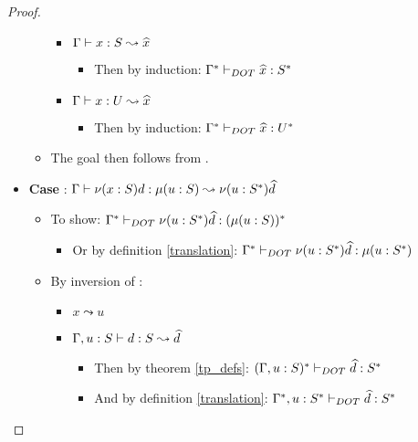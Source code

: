 \begin{proof}
\begin{itemize}
\begin{itemize}
            \begin{itemize}
                \item $\Gamma \vdash x: S \leadsto \widehat{x}$
                \begin{itemize}
                    \item Then by induction: 
                        $\Gamma^{*} \vdash_{DOT} \widehat{x}: S^{*}$
                \end{itemize}
                \item $\Gamma \vdash x: U \leadsto \widehat{x}$
                \begin{itemize}
                    \item Then by induction: 
                        $\Gamma^{*} \vdash_{DOT} \widehat{x}: U^{*}$
                \end{itemize}
            \end{itemize}
            \item The goal then follows from .
        \end{itemize}
        \item \textbf{Case} : $\Gamma \vdash \nu(x:S)d: \mu(u : S) \leadsto \nu(u:S^{*})\widehat{d}$
        \begin{itemize}
            \item To show: $\Gamma^{*} \vdash_{DOT} \nu(u:S^{*})\widehat{d}: (\mu(u : S))^{*}$
            \begin{itemize}
                \item Or by definition \ref{translation}:
                    $\Gamma^{*} \vdash_{DOT} \nu(u:S^{*})\widehat{d}: \mu(u : S^{*})$
            \end{itemize}
            \item By inversion of :
            \begin{itemize}
                \item $x \leadsto u$
                \item $\Gamma, u: S \vdash d: S \leadsto \widehat{d}$
                \begin{itemize}
                    \item Then by theorem \ref{tp_defs}:
                        $(\Gamma, u: S)^{*} \vdash_{DOT} \widehat{d}: S^{*}$
                    \item And by definition \ref{translation}:
                        $\Gamma^{*}, u: S^{*} \vdash_{DOT} \widehat{d}: S^{*}$
                \end{itemize}

\end{itemize}
\end{itemize}
\end{itemize}
\end{proof}
